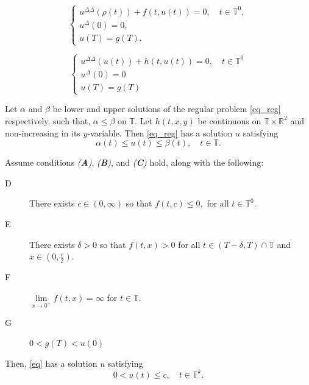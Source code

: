 \documentclass[10pt,a4paper]{amsart}
\begin{document}
\begin{equation}\label{eq}
\begin{cases}
u^{\Delta\Delta}(\rho(t)) + f(t, u(t)) = 0, \quad t \in \mathbb{T}^0,\\
u^{\Delta}(0) = 0, \\
u(T) = g(T).
\end{cases}
\end{equation}

\begin{equation}\label{eq_reg}
\begin{cases}
u^{\Delta\Delta}(u(t)) + h(t, u(t)) = 0, \quad t \in \mathbb{T}^0\\
u^{\Delta}(0)=0\\
u(T)=g(T)
\end{cases}
\end{equation}

\begin{theorem}\label{thm_reg}
	Let $\alpha$ and $\beta$ be lower and upper solutions of the regular problem \eqref{eq_reg} respectively, such that, $\alpha \leq \beta$ on $\mathbb{T}.$  Let $h(t, x, y)$ be continuous on $\mathbb{T} \times \mathbb{R}^2$ and non-increasing in its $y$-variable.  Then \eqref{eq_reg} has a solution $u$ satisfying $$\alpha(t) \leq u(t) \leq \beta(t), \quad t \in \mathbb{T}.$$
\end{theorem}

\begin{theorem}\label{main}
	Assume conditions \emph{(\textbf{A})}, \emph{(\textbf{B})}, and \emph{(\textbf{C})} hold, along with the following:
	\begin{description}
		\item[D] There exists $c \in (0,\infty)$ so that $f(t,c) \leq 0,$ for all $t \in \mathbb{T}^0.$
		\item[E] There exists $\delta > 0$ so that $f(t,x) > 0$ for all $t \in (T-\delta,T) \cap \mathbb{T}$ and $x \in \left(0, \frac{c}{2}\right).$
		\item[F] $\lim\limits_{x \rightarrow 0^{+}} f(t,x) = \infty$ for $t \in \mathbb{T}.$ 
        \item[G] $0< g(T) <u(0)$ 
	\end{description}
    Then, \eqref{eq} has a solution $u$ satisfying $$0 < u(t) \leq c, \quad t \in \mathbb{T}^k.$$
\end{theorem}
\end{document}
